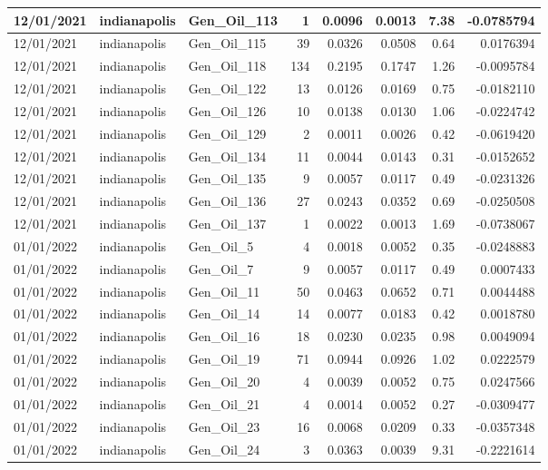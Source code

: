 \documentclass[
  letterpaper,
  DIV=11,
  numbers=noendperiod]{scrartcl}
\begin{document}
\begin{tabular}{l|l|l|r|r|r|r|r}
\hline
12/01/2021 & indianapolis & Gen\_Oil\_113 & 1 & 0.0096 & 0.0013 & 7.38 & -0.0785794\\
\hline
12/01/2021 & indianapolis & Gen\_Oil\_115 & 39 & 0.0326 & 0.0508 & 0.64 & 0.0176394\\
\hline
12/01/2021 & indianapolis & Gen\_Oil\_118 & 134 & 0.2195 & 0.1747 & 1.26 & -0.0095784\\
\hline
12/01/2021 & indianapolis & Gen\_Oil\_122 & 13 & 0.0126 & 0.0169 & 0.75 & -0.0182110\\
\hline
12/01/2021 & indianapolis & Gen\_Oil\_126 & 10 & 0.0138 & 0.0130 & 1.06 & -0.0224742\\
\hline
12/01/2021 & indianapolis & Gen\_Oil\_129 & 2 & 0.0011 & 0.0026 & 0.42 & -0.0619420\\
\hline
12/01/2021 & indianapolis & Gen\_Oil\_134 & 11 & 0.0044 & 0.0143 & 0.31 & -0.0152652\\
\hline
12/01/2021 & indianapolis & Gen\_Oil\_135 & 9 & 0.0057 & 0.0117 & 0.49 & -0.0231326\\
\hline
12/01/2021 & indianapolis & Gen\_Oil\_136 & 27 & 0.0243 & 0.0352 & 0.69 & -0.0250508\\
\hline
12/01/2021 & indianapolis & Gen\_Oil\_137 & 1 & 0.0022 & 0.0013 & 1.69 & -0.0738067\\
\hline
01/01/2022 & indianapolis & Gen\_Oil\_5 & 4 & 0.0018 & 0.0052 & 0.35 & -0.0248883\\
\hline
01/01/2022 & indianapolis & Gen\_Oil\_7 & 9 & 0.0057 & 0.0117 & 0.49 & 0.0007433\\
\hline
01/01/2022 & indianapolis & Gen\_Oil\_11 & 50 & 0.0463 & 0.0652 & 0.71 & 0.0044488\\
\hline
01/01/2022 & indianapolis & Gen\_Oil\_14 & 14 & 0.0077 & 0.0183 & 0.42 & 0.0018780\\
\hline
01/01/2022 & indianapolis & Gen\_Oil\_16 & 18 & 0.0230 & 0.0235 & 0.98 & 0.0049094\\
\hline
01/01/2022 & indianapolis & Gen\_Oil\_19 & 71 & 0.0944 & 0.0926 & 1.02 & 0.0222579\\
\hline
01/01/2022 & indianapolis & Gen\_Oil\_20 & 4 & 0.0039 & 0.0052 & 0.75 & 0.0247566\\
\hline
01/01/2022 & indianapolis & Gen\_Oil\_21 & 4 & 0.0014 & 0.0052 & 0.27 & -0.0309477\\
\hline
01/01/2022 & indianapolis & Gen\_Oil\_23 & 16 & 0.0068 & 0.0209 & 0.33 & -0.0357348\\
\hline
01/01/2022 & indianapolis & Gen\_Oil\_24 & 3 & 0.0363 & 0.0039 & 9.31 & -0.2221614\\

\end{tabular}
\end{document}
